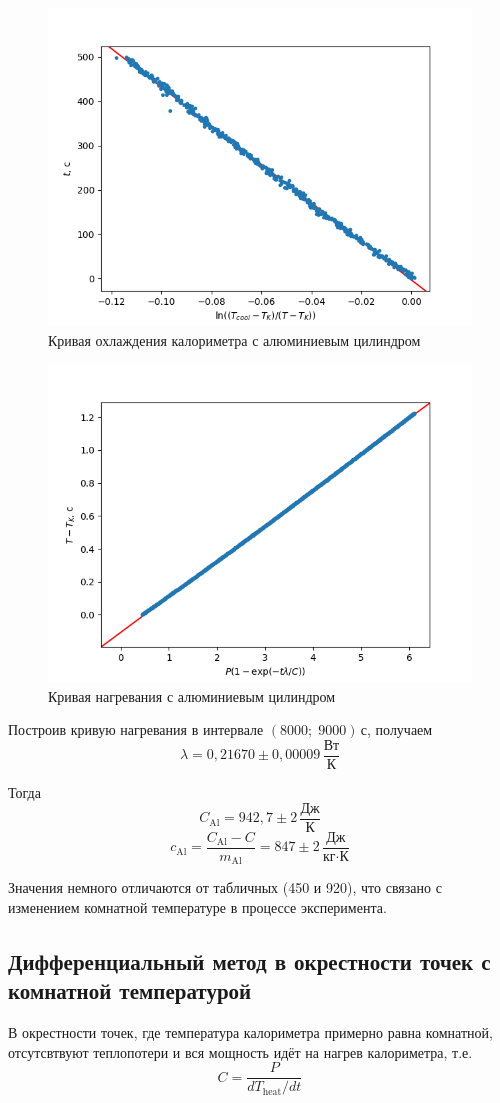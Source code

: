 \documentclass[a4paper, 12pt]{article}
\begin{document}
    \begin{figure}[ht!]
        \centering\includegraphics[width=0.6\linewidth]{img/lca.png}
        \caption{Кривая охлаждения калориметра с алюминиевым цилиндром}
    \end{figure}

    \begin{figure}[ht!]
        \centering\includegraphics[width=0.6\linewidth]{img/lha.png}
        \caption{Кривая нагревания с алюминиевым цилиндром}
    \end{figure}

    Построив кривую нагревания в интервале $(8000;\;9000)\,\text{с}$, получаем
    $$\lambda=0{,}21670\pm 0{,}00009\,\frac{\text{Вт}}{\text{К}}$$

    Тогда $$C_\text{Al}=942{,}7\pm 2\,\frac{\text{Дж}}{\text{К}}$$
    $$c_\text{Al}=\frac{C_\text{Al}-C}{m_\text{Al}}=847\pm 2\,\frac{\text{Дж}}{\text{кг}\cdot\text{К}}$$

    Значения немного отличаются от табличных (450 и 920), что связано с изменением
    комнатной температуре в процессе эксперимента.


    \subsection{Дифференциальный метод в окрестности точек с комнатной температурой}
    В окрестности точек, где температура калориметра примерно равна комнатной,
    отсутсвтвуют теплопотери и вся мощность идёт на нагрев калориметра, т.е.
    \[C=\frac{P}{dT_\text{heat}/dt}\]
    
\end{document}
